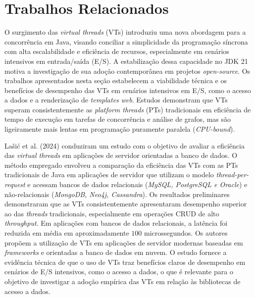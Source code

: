 \section{Trabalhos Relacionados}
\label{sec:trabalhos_relacionados}

O surgimento das \textit{virtual threads} (VTs) introduziu uma nova abordagem para a concorrência em Java, visando conciliar a simplicidade da programação síncrona com alta escalabilidade e eficiência de recursos, especialmente em cenários intensivos em entrada/saída (E/S). A estabilização dessa capacidade no JDK 21  motiva a investigação de sua adoção contemporânea em projetos \textit{open-source}. Os trabalhos apresentados nesta seção estabelecem a viabilidade técnica e os benefícios de desempenho das VTs em cenários intensivos em E/S, como o acesso a dados e a renderização de \textit{templates} \textit{web}. Estudos demonstram que VTs superam consistentemente as \textit{platform threads} (PTs) tradicionais em eficiência de tempo de execução em tarefas de concorrência e análise de grafos, mas são ligeiramente mais lentas em programação puramente paralela (\textit{CPU-bound}).

La{\v{s}}i{\'c} et al. (2024)\nocite{lasic:24} conduziram um estudo com o objetivo de avaliar a eficiência das \textit{virtual threads} em aplicações de servidor orientadas a banco de dados. O método empregado envolveu a comparação da eficiência das VTs com as PTs tradicionais de Java em aplicações de servidor que utilizam o modelo \textit{thread-per-request} e acessam bancos de dados relacionais (\textit{MySQL, PostgreSQL e Oracle}) e não-relacionais (\textit{MongoDB, Neo4j, Cassandra}). Os resultados preliminares demonstraram que as VTs consistentemente apresentaram desempenho superior ao das \textit{threads} tradicionais, especialmente em operações CRUD de alto \textit{throughput}. Em aplicações com bancos de dados relacionais, a latência foi reduzida em média em aproximadamente $100$ microssegundos. Os autores propõem a utilização de VTs em aplicações de servidor modernas baseadas em \textit{frameworks} e orientadas a banco de dados em nuvem. O estudo  fornece a evidência técnica de que o uso de VTs traz benefícios claros de desempenho em cenários de E/S intensivos, como o acesso a dados, o que é relevante para o objetivo de investigar a adoção empírica das VTs em relação às bibliotecas de acesso a dados.

